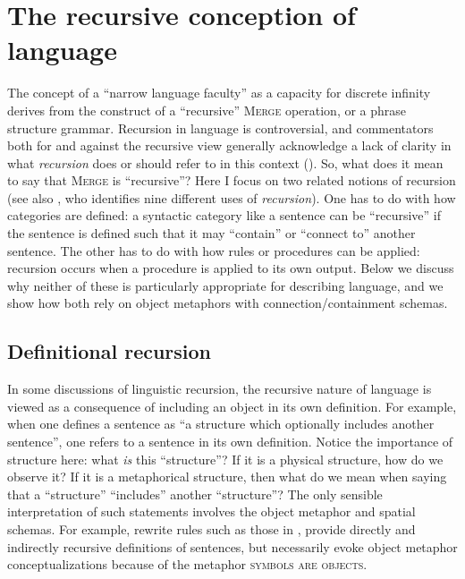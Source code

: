 \section{The recursive conception of language}

The concept of a “narrow language faculty” as a capacity for discrete infinity derives from the construct of a “recursive” \textsc{Merge} operation, or a phrase structure grammar. Recursion in language is controversial, and commentators both for and against the recursive view generally acknowledge a lack of clarity in what \textit{recursion} does or should refer to in this context (\citealt{Lobina2011,PullumScholz2010,Tomalin2011,vanderHulst2010}). So, what does it mean to say that \textsc{Merge} is “recursive”? Here I focus on two related notions of recursion (see also \citealt{Tomalin2011}, who identifies nine different uses of \textit{recursion}). One has to do with how categories are defined: a syntactic category like a sentence can be “recursive” if the sentence is defined such that it may “contain” or “connect to” another sentence. The other has to do with how rules or procedures can be applied: recursion occurs when a procedure is applied to its own output. Below we discuss why neither of these is particularly appropriate for describing language, and we show how both rely on object metaphors with connection/containment schemas.

\subsection{Definitional recursion}

In some discussions of linguistic recursion, the recursive nature of language is viewed as a consequence of including an object in its own definition. For example, when one defines a sentence as “a structure which optionally includes another sentence”, one refers to a sentence in its own definition. Notice the importance of structure here: what \textit{is} this “structure”? If it is a physical structure, how do we observe it? If it is a metaphorical structure, then what do we mean when saying that a “structure” “includes” another “structure”? The only sensible interpretation of such statements involves the object metaphor and spatial schemas. For example, rewrite rules such as those in {}, provide directly and indirectly recursive definitions of sentences, but necessarily evoke object metaphor conceptualizations because of the metaphor \textsc{symbols are objects}.

